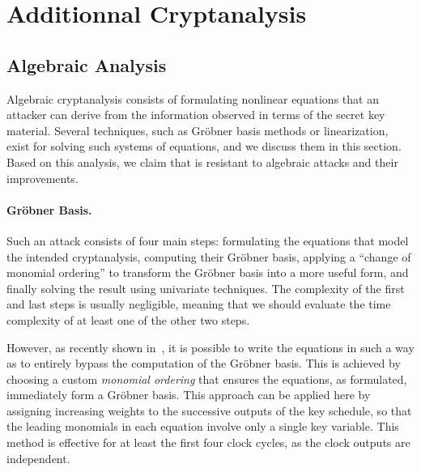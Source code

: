 \section{Additionnal Cryptanalysis}
\label{sec:appendix-cryptanalysis}



\subsection{Algebraic Analysis}
\label{sec:cryptanalysis-algebraic}
Algebraic cryptanalysis consists of formulating nonlinear equations that an attacker can derive from the information observed in terms of the secret key material. Several techniques, such as Gröbner basis methods or linearization, exist for solving such systems of equations, and we discuss them in this section. Based on this analysis, we claim that \coolName{} is resistant to algebraic attacks and their improvements.



\paragraph{Gröbner Basis.} Such an attack consists of four main steps: formulating the equations that model the intended cryptanalysis, computing their Gröbner basis, applying a ``change of monomial ordering'' to transform the Gröbner basis into a more useful form, and finally solving the result using univariate techniques. The complexity of the first and last steps is usually negligible, meaning that we should evaluate the time complexity of at least one of the other two steps.

However, as recently shown in~\cite{C:BBLAOP24}, it is possible to write the equations in such a way as to entirely bypass the computation of the Gröbner basis. This is achieved by choosing a custom \emph{monomial ordering} that ensures the equations, as formulated, immediately form a Gröbner basis. This approach can be applied here by assigning increasing weights to the successive outputs of the key schedule, so that the leading monomials in each equation involve only a single key variable. This method is effective for at least the first four clock cycles, as the clock outputs are independent.


